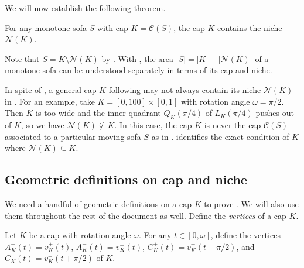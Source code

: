 We will now establish the following theorem.

\begin{theorem}

For any monotone sofa \(S\) with cap \(K = \mathcal{C}(S)\), the cap \(K\) contains the niche \(\mathcal{N}(K)\).

\label{thm:niche-in-cap}
\end{theorem}

Note that \(S = K \setminus \mathcal{N}(K)\) by . With , the area \(|S| = |K| - |\mathcal{N}(K)|\) of a monotone sofa can be understood separately in terms of its cap and niche.

\begin{remark}

In spite of , a general cap \(K\) following  may not always contain its niche \(\mathcal{N}(K)\) in . For an example, take \(K = [0, 100] \times [0, 1]\) with rotation angle \(\omega = \pi/2\). Then \(K\) is too wide and the inner quadrant \(Q_K^-(\pi/4)\) of \(L_K(\pi/4)\) pushes out of \(K\), so we have \(\mathcal{N}(K) \not\subseteq K\). In this case, the cap \(K\) is never the cap \(\mathcal{C}(S)\) associated to a particular moving sofa \(S\) as in .  identifies the exact condition of \(K\) where \(\mathcal{N}(K) \subseteq K\).

\label{rem:niche-not-in-cap}
\end{remark}

\subsection{Geometric definitions on cap and niche}

We need a handful of geometric definitions on a cap \(K\) to prove . We will also use them throughout the rest of the document as well. Define the \emph{vertices} of a cap \(K\).

\begin{definition}

Let \(K\) be a cap with rotation angle \(\omega\). For any \(t \in [0, \omega]\), define the vertices \(A^+_K(t) = v^+_K(t)\), \(A^-_K(t) = v^-_K(t)\), \(C^+_K(t) = v^+_K(t + \pi/2)\), and \(C^-_K(t) = v^-_K(t + \pi/2)\) of \(K\).

\label{def:cap-vertices}
\end{definition}

